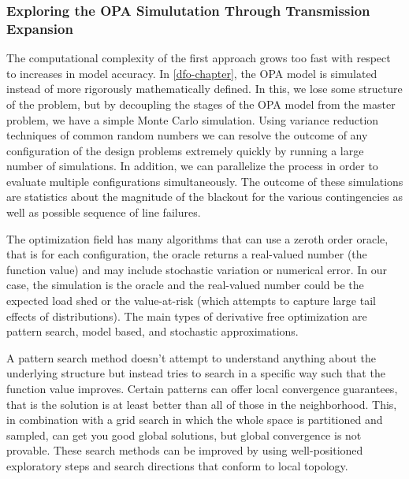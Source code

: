 \subsubsection{Exploring the OPA Simulutation Through Transmission Expansion}
The computational complexity of the first approach grows too fast with respect to increases in model accuracy.  In \cref{dfo-chapter}, the OPA model is simulated instead of more rigorously mathematically defined.  In this, we lose some structure of the problem, but by decoupling the stages of the OPA model from the master problem, we have a simple Monte Carlo simulation.  Using variance reduction techniques of common random numbers we can resolve the outcome of any configuration of the design problems extremely quickly by running a large number of simulations.  In addition, we can parallelize the process in order to evaluate multiple configurations simultaneously.  The outcome of these simulations are statistics about the magnitude of the blackout for the various contingencies as well as possible sequence of line failures.

The optimization field has many algorithms that can use a zeroth order oracle, that is for each configuration, the oracle returns a real-valued number (the function value) and may include stochastic variation or numerical error.  In our case, the simulation is the oracle and the real-valued number could be the expected load shed or the value-at-risk (which attempts to capture large tail effects of distributions).  The main types of derivative free optimization are pattern search, model based, and stochastic approximations.  

A pattern search method doesn't attempt to understand anything about the underlying structure but instead tries to search in a specific way such that the function value improves.  Certain patterns can offer local convergence guarantees, that is the solution is at least better than all of those in the neighborhood.  This, in combination with a grid search in which the whole space is partitioned and sampled, can get you good global solutions, but global convergence is not provable.  These search methods can be improved by using well-positioned exploratory steps and search directions that conform to local topology.


